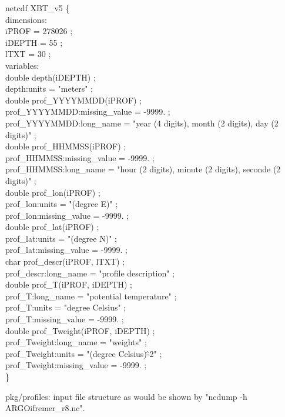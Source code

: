 \begin{table}[phtb]
\begin{tabbing}
netcdf XBT\_v5 \{\\
dimensions:\\
\hspace{0.1cm} \= i\=PROF = 278026 ;\\
\>  iDEPTH = 55 ;\\
\>  lTXT = 30 ;\\
variables:\\
\>  double depth(iDEPTH) ;\\
\>  \> depth:units = "meters" ;\\
\>  double prof\_YYYYMMDD(iPROF) ;\\
\>  \> prof\_YYYYMMDD:missing\_value = -9999. ;\\
\>  \> prof\_YYYYMMDD:long\_name = "year (4 digits), month (2 digits), day (2 digits)" ;\\
\>  double prof\_HHMMSS(iPROF) ;\\
\>  \> prof\_HHMMSS:missing\_value = -9999. ;\\
\>  \> prof\_HHMMSS:long\_name = "hour (2 digits), minute (2 digits), seconde (2 digits)" ;\\
\>  double prof\_lon(iPROF) ;\\
\>  \> prof\_lon:units = "(degree E)" ;\\
\>  \> prof\_lon:missing\_value = -9999. ;\\
\>  double prof\_lat(iPROF) ;\\
\>  \> prof\_lat:units = "(degree N)" ;\\
\>  \> prof\_lat:missing\_value = -9999. ;\\
\>  char prof\_descr(iPROF, lTXT) ;\\
\>  \> prof\_descr:long\_name = "profile description" ;\\
\>  double prof\_T(iPROF, iDEPTH) ;\\
\>  \> prof\_T:long\_name = "potential temperature" ;\\
\>  \> prof\_T:units = "degree Celsius" ;\\
\>  \> prof\_T:missing\_value = -9999. ;\\
\>  double prof\_Tweight(iPROF, iDEPTH) ;\\
\>  \> prof\_Tweight:long\_name = "weights" ;\\
\>  \> prof\_Tweight:units = "(degree Celsius)\^-2" ;\\
\>  \> prof\_Tweight:missing\_value = -9999. ;\\
\}\\
\end{tabbing}
\caption{pkg/profiles: input file structure as would be shown by "ncdump -h ARGOifremer\_r8.nc".}
\label{PkgProfInput}
\end{table}

